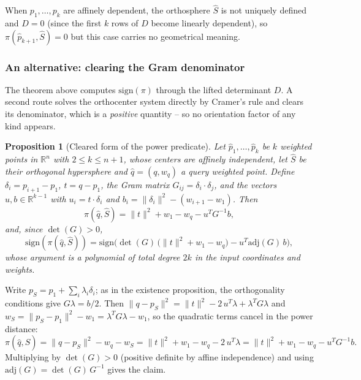 \documentclass[12pt]{article}
\makeatletter
\newtheorem{proposition}[theorem]{Proposition}
\theoremstyle{definition}
\theoremstyle{remark}
\renewenvironment{proof}[1][\proofname]{\par
  \pushQED{\qed}%
  \normalfont \footnotesize \topsep6\p@\@plus6\p@\relax
  \list{}{\leftmargin=2em
          \settowidth{\itemindent}{\itshape#1}%
          \labelwidth=\itemindent
          \parsep=0pt \listparindent=\parindent 
  }
  \item[\hskip\labelsep
        \itshape
    #1\@addpunct{.}]\ignorespaces
}{%
  \popQED\endlist\@endpefalse
}
\makeatother
\begin{document}
When $p_1, \ldots, p_k$ are affinely dependent, the orthosphere $\hat S$ is not uniquely defined and $D = 0$ (since the first $k$ rows of $D$ become linearly dependent), so $\pi(\hat p_{k+1}, \hat S) = 0$ but this case carries no geometrical meaning.

\subsubsection*{An alternative: clearing the Gram denominator}

The theorem above computes $\mathrm{sign}(\pi)$ through the lifted determinant $D$. A second route solves the orthocenter system directly by Cramer's rule and
clears its denominator, which is a \emph{positive} quantity -- so no
orientation factor of any kind appears.

\begin{proposition}[Cleared form of the power predicate]\label{prop:cleared_power}
Let $\hat p_1, \ldots, \hat p_k$ be $k$ weighted points in $\mathbb{R}^n$ with
$2 \leq k \leq n+1$, whose centers are affinely independent, let $\hat S$ be
their orthogonal hypersphere and $\hat q = (q, w_q)$ a query weighted point.
Define $\delta_i = p_{i+1} - p_1$, $t = q - p_1$, the Gram matrix
$G_{ij} = \delta_i \cdot \delta_j$, and the vectors $u, b \in \mathbb{R}^{k-1}$
with $u_i = t \cdot \delta_i$ and $b_i = \|\delta_i\|^2 - (w_{i+1} - w_1)$.
Then
\begin{equation*}
    \pi(\hat q, \hat S) = \|t\|^2 + w_1 - w_q - u^T G^{-1} b,
\end{equation*}
and, since $\det(G) > 0$,
\begin{equation*}
    \mathrm{sign}(\pi(\hat q, \hat S)) =
    \mathrm{sign}\Big( \det(G)\,\big(\|t\|^2 + w_1 - w_q\big) - u^T \mathrm{adj}(G)\, b \Big),
\end{equation*}
whose argument is a polynomial of total degree $2k$ in the input coordinates
and weights.
\end{proposition}
\begin{proof}
Write $p_S = p_1 + \sum_{i} \lambda_i \delta_i$; as in the existence
proposition, the orthogonality conditions give $G\lambda = b/2$. Then
$\|q - p_S\|^2 = \|t\|^2 - 2\,u^T\lambda + \lambda^T G \lambda$ and
$w_S = \|p_S - p_1\|^2 - w_1 = \lambda^T G \lambda - w_1$, so the quadratic
terms cancel in the power distance:
\begin{equation*}
    \pi(\hat q, \hat S) = \|q - p_S\|^2 - w_q - w_S
    = \|t\|^2 + w_1 - w_q - 2\,u^T\lambda
    = \|t\|^2 + w_1 - w_q - u^T G^{-1} b .
\end{equation*}
Multiplying by $\det(G) > 0$ (positive definite by affine independence) and
using $\mathrm{adj}(G) = \det(G)\, G^{-1}$ gives the claim.
\end{proof}
\end{document}
